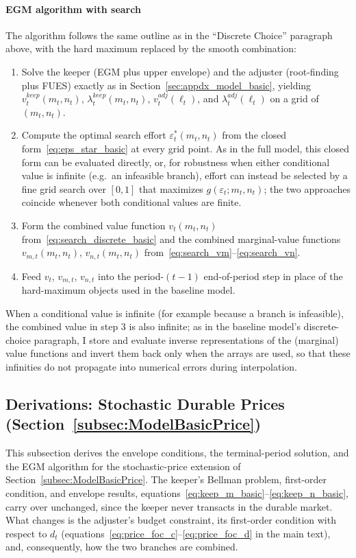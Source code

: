\paragraph{EGM algorithm with search}
The algorithm follows the same outline as in the ``Discrete Choice'' paragraph above, with the hard maximum replaced by the smooth combination:
\begin{enumerate}
	\item Solve the keeper (EGM plus upper envelope) and the adjuster (root-finding plus FUES) exactly as in Section~\ref{sec:appdx_model_basic}, yielding $v_t^{keep}(m_t,n_t)$, $\lambda_t^{keep}(m_t,n_t)$, $v_t^{adj}(\ell_t)$, and $\lambda_t^{adj}(\ell_t)$ on a grid of $(m_t,n_t)$.
	\item Compute the optimal search effort $\varepsilon_t^\ast(m_t,n_t)$ from the closed form~\eqref{eq:eps_star_basic} at every grid point. As in the full model, this closed form can be evaluated directly, or, for robustness when either conditional value is infinite (e.g.\ an infeasible branch), effort can instead be selected by a fine grid search over $[0,1]$ that maximizes $g(\varepsilon_t;m_t,n_t)$; the two approaches coincide whenever both conditional values are finite.
	\item Form the combined value function $v_t(m_t,n_t)$ from~\eqref{eq:search_discrete_basic} and the combined marginal-value functions $v_{m,t}(m_t,n_t)$, $v_{n,t}(m_t,n_t)$ from~\eqref{eq:search_vm}--\eqref{eq:search_vn}.
	\item Feed $v_t$, $v_{m,t}$, $v_{n,t}$ into the period-$(t-1)$ end-of-period step in place of the hard-maximum objects used in the baseline model.
\end{enumerate}
When a conditional value is infinite (for example because a branch is infeasible), the combined value in step 3 is also infinite; as in the baseline model's discrete-choice paragraph, I store and evaluate inverse representations of the (marginal) value functions and invert them back only when the arrays are used, so that these infinities do not propagate into numerical errors during interpolation.


\subsection{Derivations: Stochastic Durable Prices (Section~\ref{subsec:ModelBasicPrice})}\label{subsec:appdx_price_basic}

This subsection derives the envelope conditions, the terminal-period solution, and the EGM algorithm for the stochastic-price extension of Section~\ref{subsec:ModelBasicPrice}. The keeper's Bellman problem, first-order condition, and envelope results, equations~\eqref{eq:keep_m_basic}--\eqref{eq:keep_n_basic}, carry over unchanged, since the keeper never transacts in the durable market. What changes is the adjuster's budget constraint, its first-order condition with respect to $d_t$ (equations~\eqref{eq:price_foc_c}--\eqref{eq:price_foc_d} in the main text), and, consequently, how the two branches are combined.

